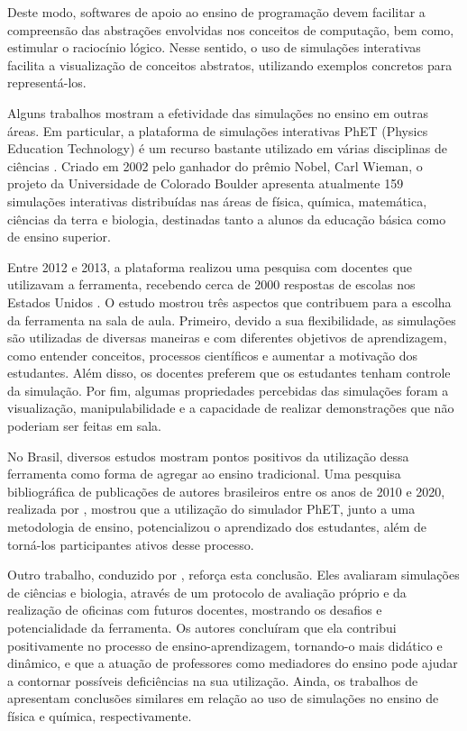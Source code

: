 Deste modo, softwares de apoio ao ensino de programação devem facilitar a compreensão das abstrações envolvidas nos conceitos de computação, bem como, estimular o raciocínio lógico. Nesse sentido, o uso de simulações interativas facilita a visualização de conceitos abstratos, utilizando exemplos concretos para representá-los. 


Alguns trabalhos mostram a efetividade das simulações no ensino em outras áreas. Em particular, a plataforma de simulações interativas PhET (Physics Education Technology) é um recurso bastante utilizado em várias disciplinas de ciências \citep{khatri2013over}. Criado em 2002 pelo ganhador do prêmio Nobel, Carl Wieman, o projeto da Universidade de Colorado Boulder apresenta atualmente 159 simulações interativas distribuídas nas áreas de física, química, matemática, ciências da terra e biologia, destinadas tanto a alunos da educação básica como de ensino superior.

Entre 2012 e 2013, a plataforma realizou uma pesquisa com docentes que utilizavam a ferramenta, recebendo cerca de 2000 respostas de escolas nos Estados Unidos \citep{price2018and}. O estudo mostrou três aspectos que contribuem para a escolha da ferramenta na sala de aula. Primeiro, devido a sua flexibilidade, as simulações são utilizadas de diversas maneiras e com diferentes objetivos de aprendizagem, como entender conceitos, processos científicos e aumentar a motivação dos estudantes. Além disso, os docentes preferem que os estudantes tenham controle da simulação. Por fim, algumas propriedades percebidas das simulações foram a visualização, manipulabilidade e a capacidade de realizar demonstrações que não poderiam ser feitas em sala.

No Brasil, diversos estudos mostram pontos positivos da utilização dessa ferramenta como forma de agregar ao ensino tradicional. Uma pesquisa bibliográfica de publicações de autores brasileiros entre os anos de 2010 e 2020, realizada por \citet{ramos2020ensino}, mostrou que a utilização do simulador PhET, junto a uma metodologia de ensino, potencializou o aprendizado dos estudantes, além de torná-los participantes ativos desse processo.

Outro trabalho, conduzido por \citet{cravo2021avaliaccao}, reforça esta conclusão. Eles avaliaram simulações de ciências e biologia, através de um protocolo de avaliação próprio e da realização de oficinas com futuros docentes, mostrando os desafios e potencialidade da ferramenta. Os autores concluíram que ela contribui positivamente no processo de ensino-aprendizagem, tornando-o mais didático e dinâmico,  e que a atuação de professores como mediadores do ensino pode ajudar a contornar possíveis deficiências na sua utilização. Ainda, os trabalhos de \citet{araujo2021uso,santos2020revisao} apresentam conclusões similares em relação ao uso de simulações no ensino de física e química, respectivamente.

